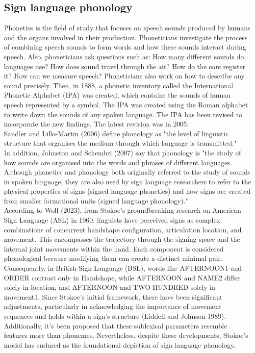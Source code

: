  \subsection{Sign language phonology}

 Phonetics is the field of study that focuses on speech sounds produced by humans and the organs involved in their production. Phoneticians investigate the process of combining speech sounds to form words and how these sounds interact during speech. Also, phoneticians ask questions such as: How many different sounds do languages use? How does sound travel through the air? How do the ears register it? How can we measure speech? Phoneticians also work on how to describe any sound precisely. Then, in 1888, a phonetic inventory called the International Phonetic Alphabet (IPA) was created, which contains the sounds of human speech represented by a symbol. The IPA was created using the Roman alphabet to write down the sounds of any spoken language. The IPA has been revised to incorporate the new findings. The latest revision was in 2005. \\

Sandler and Lillo-Martin (2006) define phonology as "the
level of linguistic structure that organises the medium through which language
is transmitted." \\
 In addition, Johnston and Schembri (2007) say that phonology is "the study of how sounds are organised into the words and phrases of different languages. Although phonetics and phonology both
originally referred to the study of sounds in spoken language, they are also
used by sign language researchers to refer to the physical properties of signs
(signed language phonetics) and how signs are created from smaller
formational units (signed language phonology)." \\

 According to Woll (2023), from Stokoe's groundbreaking research on American Sign Language (ASL) in 1960, linguists have perceived signs as complex combinations of concurrent handshape configuration, articulation location, and movement. This encompasses the trajectory through the signing space and the internal joint movements within the hand. Each component is considered phonological because modifying them can create a distinct minimal pair. Consequently, in British Sign Language (BSL), words like AFTERNOON1 and ORDER contrast only in Handshape, while AFTERNOON and NAME2 differ solely in location, and AFTERNOON and TWO-HUNDRED solely in movement1. Since Stokoe's initial framework, there have been significant adjustments, particularly in acknowledging the importance of movement sequences and holds within a sign's structure (Liddell and Johnson 1989). Additionally, it's been proposed that these sublexical parameters resemble features more than phonemes. Nevertheless, despite these developments, Stokoe's model has endured as the foundational depiction of sign language phonology.

